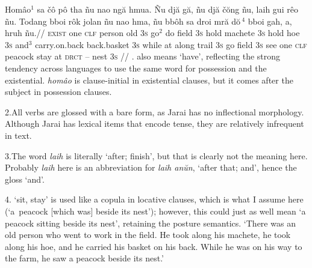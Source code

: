 
\let\\=\textsc
{}

\ex[glstyle=wrap]
\beginglpanel
\gla Hom\^{a}o$^1$ sa \v{c}\^{o} p\^{o} tha  \~{n}u nao ng\u{a}
hmua. \~{N}u dj\u{a} g\u{a}, \~{n}u dj\u{a} \v{c}\u{o}ng \~{n}u,
laih gui r\^{e}o \~{n}u. Todang bboi r\^{o}k jolan \~{n}u nao
hma, \~{n}u bb\^{o}h sa droi mr\u{a} d\u{o}$\,^4$ bboi gah, a, hruh
\~{n}u.//
\glb \\{exist} one \\{clf} person old \\{3s} go$^2$ do field
\\{3s} hold machete \\{3s} hold hoe \\{3s} and$^3$ carry.on.back
back.basket \\{3s} while at along trail \\{3s} go field \\{3s}
see one \\{clf} peacock stay at \\{drct} -- nest \\{3s}
//
. also means `have', reflecting the
strong tendency across languages to use the same word for
possession and the existential. {\it hom\^{a}o} is clause-initial
in existential clauses, but it comes after the subject in
possession clauses.

2.\enspace All verbs are glossed with a bare form, as Jarai has
no inflectional morphology. Although Jarai has lexical items that
encode tense, they are relatively infrequent in text.

3.\enspace The word {\it laih} is literally `after; finish', but
that is clearly not the meaning here. Probably {\it laih} here is
an abbreviation for {\it laih an\u{u}n}, `after that; and', hence
the gloss `and'.

4. `sit, stay' is used like a copula in
locative clauses, which is what I assume here (`a~peacock
[which was] beside its nest'); however, this could just as well
mean `a peacock sitting beside its nest', retaining the posture
semantics.
\endpanel
\bigskip
`There was an old person who went to work in the field. He took
along his machete, he took along his hoe, and he carried his
basket on his back. While he was on his way to the farm, he saw a
peacock beside its nest.'
\xe

